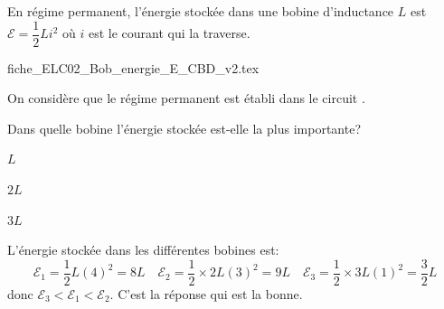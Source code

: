 \hauteurLargeurCadreReponse		{8mm}{3.5cm}
\initialisationEntrainement

En régime permanent, l'énergie stockée dans une bobine d'inductance $L$ est $\mathcal{E}=\dfrac{1}{2}Li^{2}$ où $i$ est le courant qui la traverse.

\minusBigskip\minusSmallskip


\debutEntrainement

\begin{center}
{fiche_ELC02_Bob_energie_E_CBD_v2.tex}
\end{center}

\minusSmallskip\minusSmallskip


\begin{enonce}
On considère que le régime permanent est établi dans le circuit .

Dans quelle bobine l'énergie stockée est-elle la plus importante?

\begin{listeQCM4Colonnes}
\item $L$
\item $2L$
\item $3L$
\end{listeQCM4Colonnes}
\minusMedskip

\end{enonce}

\reponse{\reponseB{}}

\begin{corrige}
L'énergie stockée dans les différentes bobines est:
\[
\mathcal{E}_{1}=\dfrac{1}{2}L\left(4\right)^{2}=8L\quad\mathcal{E}_{2}=\dfrac{1}{2}\times2L\left(3\right)^{2}=9L\quad\mathcal{E}_{3}=\dfrac{1}{2}\times3L\left(1\right)^{2}=\dfrac{3}{2}L
\]
 donc $\mathcal{E}_{3}<\mathcal{E}_{1}<\mathcal{E}_{2}$. C'est la réponse \reponseB{} qui est la bonne.
\end{corrige}

